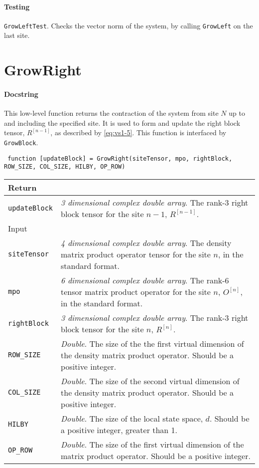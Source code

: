  \paragraph{Testing} \lstinline$GrowLeftTest$. Checks the vector norm of the system, by calling \lstinline$GrowLeft$ on the last site.

 \section{GrowRight}
 \paragraph{Docstring} This low-level function returns the contraction of the system from site \(N\) up to and including the specified site. It is used to form and update the right block tensor, \(R^{[n-1]}\), as described by \cref{eq:vs1-5}. This function is interfaced by \lstinline$GrowBlock$.
 \begin{lstlisting}
 function [updateBlock] = GrowRight(siteTensor, mpo, rightBlock, ROW_SIZE, COL_SIZE, HILBY, OP_ROW) \end{lstlisting}
 \begin{longtabu}{X[1,l]X[4,l]}
 \hline
 Return & \\ \hline
 \lstinline$updateBlock$ & \emph{3 dimensional complex double array}. The rank-3 right block tensor for the site \(n - 1\), \(R^{[n-1]}\). \\ \hline
 Input & \\ \hline
 \lstinline$siteTensor$ & \emph{4 dimensional complex double array}. The density matrix product operator tensor for the site \(n\), in the standard format. \\
 \lstinline$mpo$ & \emph{6 dimensional complex double array}. The rank-6 tensor matrix product operator for the site \(n\), \(O^{[n]}\), in the standard format. \\
 \lstinline$rightBlock$ & \emph{3 dimensional complex double array}. The rank-3 right block tensor for the site \(n\), \(R^{[n]}\). \\
 \lstinline$ROW_SIZE$ & \emph{Double}. The size of the the first virtual dimension of the density matrix product operator. Should be a positive integer. \\
 \lstinline$COL_SIZE$ & \emph{Double}. The size of the second virtual dimension of the density matrix product operator. Should be a positive integer. \\
 \lstinline$HILBY$ & \emph{Double}. The size of the local state space, \(d\). Should be a positive integer, greater than 1. \\
 \lstinline$OP_ROW$ & \emph{Double}. The size of the first virtual dimension of the matrix product operator. Should be a positive integer. \\
 \hline
 \end{longtabu}
